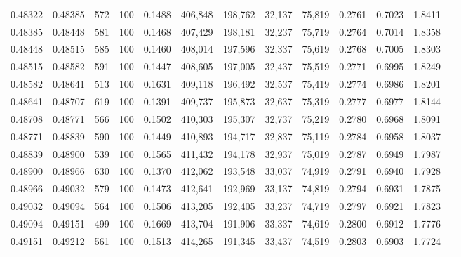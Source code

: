 \begin{tabular}{rrrrrrrrrrrrr}
0.48322 & 0.48385 &   572 & 100 &                                     0.1488 & 406,848 & 198,762 &  32,137 &  75,819 & 0.2761 & 0.7023 & 1.8411 \\
0.48385 & 0.48448 &   581 & 100 &                                     0.1468 & 407,429 & 198,181 &  32,237 &  75,719 & 0.2764 & 0.7014 & 1.8358 \\
0.48448 & 0.48515 &   585 & 100 &                                     0.1460 & 408,014 & 197,596 &  32,337 &  75,619 & 0.2768 & 0.7005 & 1.8303 \\
0.48515 & 0.48582 &   591 & 100 &                                     0.1447 & 408,605 & 197,005 &  32,437 &  75,519 & 0.2771 & 0.6995 & 1.8249 \\
0.48582 & 0.48641 &   513 & 100 &                                     0.1631 & 409,118 & 196,492 &  32,537 &  75,419 & 0.2774 & 0.6986 & 1.8201 \\
0.48641 & 0.48707 &   619 & 100 &                                     0.1391 & 409,737 & 195,873 &  32,637 &  75,319 & 0.2777 & 0.6977 & 1.8144 \\
0.48708 & 0.48771 &   566 & 100 &                                     0.1502 & 410,303 & 195,307 &  32,737 &  75,219 & 0.2780 & 0.6968 & 1.8091 \\
0.48771 & 0.48839 &   590 & 100 &                                     0.1449 & 410,893 & 194,717 &  32,837 &  75,119 & 0.2784 & 0.6958 & 1.8037 \\
0.48839 & 0.48900 &   539 & 100 &                                     0.1565 & 411,432 & 194,178 &  32,937 &  75,019 & 0.2787 & 0.6949 & 1.7987 \\
0.48900 & 0.48966 &   630 & 100 &                                     0.1370 & 412,062 & 193,548 &  33,037 &  74,919 & 0.2791 & 0.6940 & 1.7928 \\
0.48966 & 0.49032 &   579 & 100 &                                     0.1473 & 412,641 & 192,969 &  33,137 &  74,819 & 0.2794 & 0.6931 & 1.7875 \\
0.49032 & 0.49094 &   564 & 100 &                                     0.1506 & 413,205 & 192,405 &  33,237 &  74,719 & 0.2797 & 0.6921 & 1.7823 \\
0.49094 & 0.49151 &   499 & 100 &                                     0.1669 & 413,704 & 191,906 &  33,337 &  74,619 & 0.2800 & 0.6912 & 1.7776 \\
0.49151 & 0.49212 &   561 & 100 &                                     0.1513 & 414,265 & 191,345 &  33,437 &  74,519 & 0.2803 & 0.6903 & 1.7724 \\

\end{tabular}
